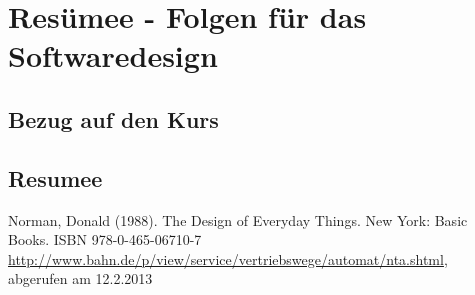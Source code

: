 \documentclass[parskip,headsepline, headtopline, %
footsepline, oneside, 12pt, headings=small]{scrreprt}
\begin{document}
 
\chapter{Resümee - Folgen für das Softwaredesign}
\section{Bezug auf den Kurs}
\section{Resumee}

\begin{thebibliography}{9}
	 Norman, Donald (1988). The Design of Everyday Things. New York: Basic Books. ISBN 978-0-465-06710-7 
	 \url{http://www.bahn.de/p/view/service/vertriebswege/automat/nta.shtml}, abgerufen am 12.2.2013
\end{thebibliography}
\end{document}
